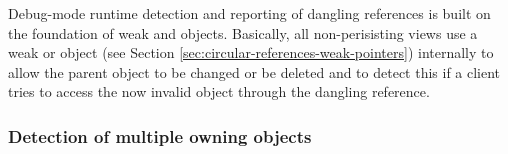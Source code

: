 \documentclass[pdf,ps2pdf,11pt]{SANDreport}
\begin{document}
Debug-mode runtime detection and reporting of dangling references is
built on the foundation of weak {} and {}
objects.  Basically, all non-perisisting views use a weak {}
or {} object (see Section
{}\ref{sec:circular-references-weak-pointers}) internally to allow the
parent object to be changed or be deleted and to detect this if a
client tries to access the now invalid object through the dangling
reference.


%
{}\subsubsection{Detection of multiple owning {} objects}
\label{sec:detection-dual-owning-rcps}
%

{\bsinglespace
\begin{figure}
\begin{center}

\end{center}
\end{figure}}
\end{document}
